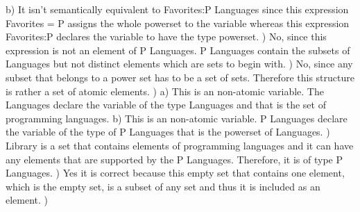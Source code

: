 \documentclass{article}
\begin{document}
b)\newline\newline
It isn't semantically equivalent to Favorites:P Languages since this expression Favorites = P assigns the whole powerset to the variable whereas this expression Favorites:P declares the variable to have the type powerset. 
\newline{})\newline\newline
No, since this expression is not an element of P Languages. P Languages contain the subsets of Languages but not distinct elements which are sets to begin with. 
\newline{})\newline\newline
No, since any subset that belongs to a power set has to be a set of sets. Therefore this structure is rather a set of atomic elements.
\newline{})\newline\newline
a)\newline\newline
This is an non-atomic variable. The Languages declare the variable of the type Languages and that is the set of programming languages.\newline\newline
b)\newline\newline
This is an non-atomic variable. P Languages declare the variable of the type of P Languages that is the powerset of Languages.
\newline{})\newline\newline
Library is a set that contains elements of programming languages and it can have any elements that are supported by the P Languages. Therefore, it is of type P Languages.  
\newline{})\newline\newline
Yes it is correct because this empty set that contains one element, which is the empty set, is a subset of any set and thus it is included as an element. 
\newline{})\newline\newline
\end{document}
